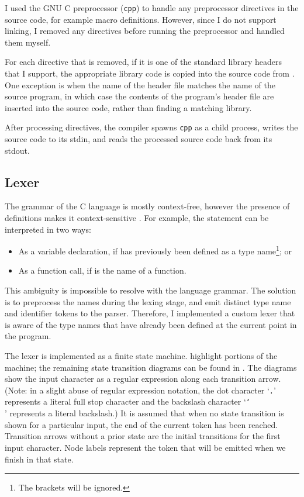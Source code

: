 \documentclass[00-main.tex]{subfiles}
\begin{document}
I used the GNU C preprocessor (\texttt{cpp})  to handle any preprocessor directives in the source code, for example macro definitions.
However, since I do not support linking, I removed any  directives before running the preprocessor and handled them myself.

For each  directive that is removed, if it is one of the standard library headers that I support, the appropriate library code is copied into the source code from .
One exception is when the name of the header file matches the name of the source program, in which case the contents of the program's header file are inserted into the source code, rather than finding a matching library.

After processing  directives, the compiler spawns \texttt{cpp} as a child process, writes the source code to its stdin, and reads the processed source code back from its stdout.

\subsection{Lexer}

The grammar of the C language is mostly context-free, however the presence of  definitions makes it context-sensitive .
For example, the statement  can be interpreted in two ways:
\begin{itemize}
\item As a variable declaration, if  has previously been defined as a type name\footnote{The brackets will be ignored.}; or
\item As a function call, if  is the name of a function.
\end{itemize}

This ambiguity is impossible to resolve with the language grammar. The solution is to preprocess the  names during the lexing stage, and emit distinct type name and identifier tokens to the parser.
Therefore, I implemented a custom lexer that is aware of the type names that have already been defined at the current point in the program.

The lexer is implemented as a finite state machine.  highlight portions of the machine; the remaining state transition diagrams can be found in .
The diagrams show the input character as a regular expression along each transition arrow. (Note: in a slight abuse of regular expression notation, the dot character `\texttt{.}' represents a literal full stop character and the backslash character `\texttt{\char`\\}' represents a literal backslash.)
It is assumed that when no state transition is shown for a particular input, the end of the current token has been reached.
Transition arrows without a prior state are the initial transitions for the first input character.
Node labels represent the token that will be emitted when we finish in that state.
\end{document}
